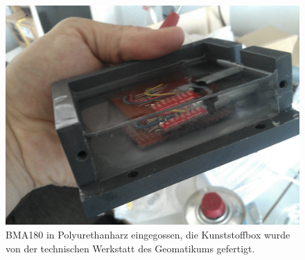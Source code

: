 \documentclass[12pt,a4paper]{scrartcl}
\begin{document}
\begin{figure}[htb]
\centering
\includegraphics[scale=.15]{hardwareimages/harz.jpg}
\caption{BMA180 in Polyurethanharz eingegossen, die Kunststoffbox wurde von der technischen Werkstatt des Geomatikums gefertigt.}
\label{harz}
\end{figure}
\end{document}
